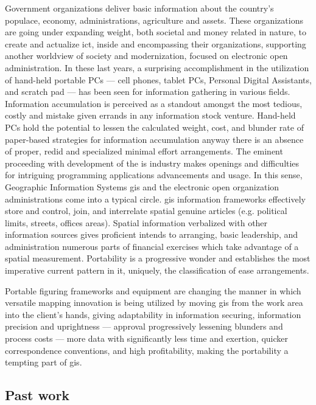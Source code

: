 Government organizations deliver basic information about the country's populace, economy, administrations, agriculture and assets. These organizations are going under expanding weight, both societal and money related in nature, to create and actualize \gls{ict}, inside and encompassing their organizations, supporting another worldview of society and modernization, focused on electronic open administration. In these last years, a surprising accomplishment in the utilization of hand-held portable PCs — cell phones, tablet PCs, Personal Digital Assistants, and scratch pad — has been seen for information gathering in various fields.
Information accumulation is perceived as a standout amongst the most tedious, costly and mistake given errands in any information stock venture. Hand-held PCs hold the potential to lessen the calculated weight, cost, and blunder rate of paper-based strategies for information accumulation anyway there is an absence of proper, redid and specialized minimal effort arrangements. The eminent proceeding with development of the \gls{is} industry makes openings and difficulties for intriguing programming applications advancements and usage. In this sense, Geographic Information Systems \gls{gis} and the electronic open organization administrations come into a typical circle. \gls{gis} information frameworks effectively store and control, join, and interrelate spatial genuine articles (e.g. political limits, streets, offices areas). Spatial information verbalized with other information sources gives proficient intends to arranging, basic leadership, and administration numerous parts of financial exercises which take advantage of a spatial measurement. Portability is a progressive wonder and establishes the most imperative current pattern in \gls{it}, uniquely, the classification of ease arrangements.

Portable figuring frameworks and equipment are changing the manner in which versatile mapping innovation is being utilized by moving \gls{gis} from the work area into the client's hands, giving adaptability in information securing, information precision and uprightness — approval progressively lessening blunders and process costs — more data with significantly less time and exertion, quicker correspondence conventions, and high profitability, making the portability a tempting part of \gls{gis}.

\subsection{Past work}

